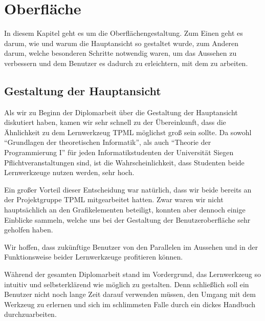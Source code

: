 

\chapter{Oberfläche}\label{GUI}

In diesem Kapitel geht es um die Oberflächengestaltung. Zum Einen geht es darum,
wie und warum die Hauptansicht so gestaltet wurde, zum Anderen darum, welche
besonderen Schritte notwendig waren, um das Aussehen zu verbessern und dem
Benutzer es dadurch zu erleichtern, mit dem \gtitool zu arbeiten.
\vspace{10pt}


\section{Gestaltung der Hauptansicht}\label{GUIMain}

Als wir zu Beginn der Diplomarbeit über die Gestaltung der Hauptansicht
diskutiert haben, kamen wir sehr schnell zu der Übereinkunft, dass die
Ähnlichkeit zu dem Lernwerkzeug TPML möglichst groß sein sollte. Da sowohl
"`Grundlagen der theoretischen Informatik"', als auch "`Theorie der
Programmierung I"' für jeden Informatikstudenten der Universität Siegen
Pflichtveranstaltungen sind, ist die Wahrscheinlichkeit, dass Studenten beide
Lernwerkzeuge nutzen werden, sehr hoch.\vspace{10pt}

Ein großer Vorteil dieser Entscheidung war natürlich, dass wir beide
bereits an der Projektgruppe TPML mitgearbeitet hatten. Zwar waren wir nicht
hauptsächlich an den Grafikelementen beteiligt, konnten aber dennoch einige
Einblicke sammeln, welche uns bei der Gestaltung der Benutzeroberfläche sehr
geholfen haben.\vspace{10pt}

Wir hoffen, dass zukünftige Benutzer von den Parallelen im Aussehen
und in der Funktionsweise beider Lernwerkzeuge profitieren können.\vspace{10pt}

Während der gesamten Diplomarbeit stand im Vordergrund, das Lernwerkzeug so
intuitiv und selbsterklärend wie möglich zu gestalten. Denn schließlich soll
ein Benutzer nicht noch lange Zeit darauf verwenden müssen, den Umgang mit dem
Werkzeug zu erlernen und sich im schlimmsten Falle durch ein dickes Handbuch
durchzuarbeiten.\vspace{10pt}

